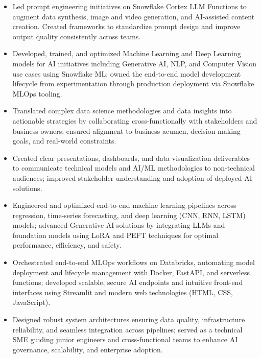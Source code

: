 \begin{itemize}
  \item Led prompt engineering initiatives on Snowflake Cortex LLM Functions to augment data
        synthesis, image and video generation, and AI-assisted content creation. Created frameworks
        to standardize prompt design and improve output quality consistently across teams.

  \item Developed, trained, and optimized Machine Learning and Deep Learning models for AI
        initiatives including Generative AI, NLP, and Computer Vision use cases using Snowflake ML;
        owned the end-to-end model development lifecycle from experimentation through production
        deployment via Snowflake MLOps tooling.

  \item Translated complex data science methodologies and data insights into actionable strategies
        by collaborating cross-functionally with stakeholders and business owners; ensured alignment
        to business acumen, decision-making goals, and real-world constraints.

  \item Created clear presentations, dashboards, and data visualization deliverables to communicate
        technical models and AI/ML methodologies to non-technical audiences; improved stakeholder
        understanding and adoption of deployed AI solutions.

  \item Engineered and optimized end-to-end machine learning pipelines across regression,
        time-series forecasting, and deep learning (CNN, RNN, LSTM) models; advanced Generative AI
        solutions by integrating LLMs and foundation models using LoRA and PEFT techniques for
        optimal performance, efficiency, and safety.

  \item Orchestrated end-to-end MLOps workflows on Databricks, automating model deployment and
        lifecycle management with Docker, FastAPI, and serverless functions; developed scalable,
        secure AI endpoints and intuitive front-end interfaces using Streamlit and modern web
        technologies (HTML, CSS, JavaScript).

  \item Designed robust system architectures ensuring data quality, infrastructure reliability, and
        seamless integration across pipelines; served as a technical SME guiding junior engineers
        and cross-functional teams to enhance AI governance, scalability, and enterprise adoption.


\end{itemize}
